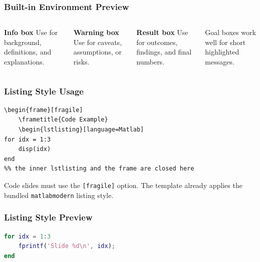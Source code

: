 \documentclass[aspectratio=169,10pt]{beamer}
\begin{document}
\begin{frame}
    \frametitle{Built-in Environment Preview}
    \begin{columns}[T]
        \begin{infobox}
            \textbf{Info box}\newline
            Use for background, definitions, and explanations.
        \end{infobox}
        \vspace{1mm}
        \begin{warnbox}
            \textbf{Warning box}\newline
            Use for caveats, assumptions, or risks.
        \end{warnbox}
        \begin{resultbox}
            \textbf{Result box}\newline
            Use for outcomes, findings, and final numbers.
        \end{resultbox}
        \vspace{2mm}
        \begin{goalbox}
            \centering
            Goal boxes work well for short highlighted messages.
        \end{goalbox}
    \end{columns}
\end{frame}

\begin{frame}[fragile]
    \frametitle{Listing Style Usage}
    \begin{lstlisting}[language={[LaTeX]TeX}]
\begin{frame}[fragile]
    \frametitle{Code Example}
    \begin{lstlisting}[language=Matlab]
for idx = 1:3
    disp(idx)
end
%% the inner lstlisting and the frame are closed here
    \end{lstlisting}
    \begin{warnbox}
        Code slides must use the \texttt{[fragile]} option. The template already applies the bundled \texttt{matlabmodern} listing style.
    \end{warnbox}
\end{frame}

\begin{frame}[fragile]
    \frametitle{Listing Style Preview}
    \begin{lstlisting}[language=Matlab]
for idx = 1:3
    fprintf('Slide %d\n', idx);
end
    \end{lstlisting}
\end{frame}
\end{document}
